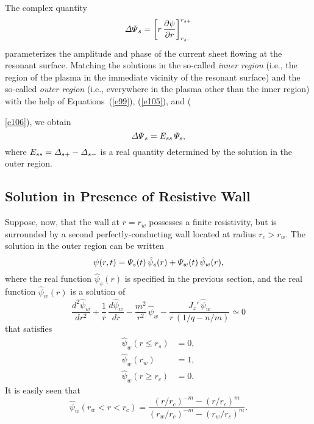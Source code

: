\documentclass[notitlepage,12pt]{article}
\begin{document}
The complex quantity
\begin{equation}
{\mit\Delta\Psi}_s = \left[r\,\frac{\partial \psi}{\partial r}\right]_{r_{s-}}^{r_{s+}}
\end{equation}
parameterizes the amplitude and phase of the current sheet flowing at the resonant surface. Matching the solutions
in the so-called {\em inner region}\/ (i.e., the region of the plasma in the immediate vicinity of the resonant surface)
and the so-called {\em outer region}\/ (i.e., everywhere in the plasma other than the inner region) with the help
of Equations~(\ref{e99}), (\ref{e105}), and ({\ref{e106}), we obtain
\begin{equation}
{\mit\Delta\Psi}_s = E_{ss}\,{\mit\Psi}_s,
\end{equation}
where $E_{ss}= {\mit\Delta}_{s+}-{\mit\Delta}_{s-}$ is a real quantity determined by the solution in the outer region. 

\subsection{Solution in Presence of Resistive Wall}\label{resistive}
Suppose, now, that the wall at $r=r_w$ possesses a finite resistivity, but is surrounded by a second perfectly-conducting wall
located at radius $r_c>r_w$.
The solution in the outer region can be written
\begin{equation}\label{e111}
\psi(r,t) = {\mit\Psi}_s(t)\,\hat{\psi}_s(r) + {\mit\Psi}_w(t)\,\hat{\psi}_w(r),
\end{equation}
where the real function $\hat{\psi}_s(r)$ is specified in the previous section, and the real function  $\hat{\psi}_w(r)$ is a solution of 
\begin{equation}\label{e100a}
\frac{d^2\hat{\psi}_w}{dr^2} + \frac{1}{r}\,\frac{d\hat{\psi}_w}{dr}-\frac{m^2}{r^2}\,\hat{\psi}_w - \frac{J_z'\,\hat{\psi}_w}{r\,(1/q-n/m)}\simeq 0
\end{equation}
that satisfies
\begin{align}\label{e101a}
\hat{\psi}_w(r\leq r_s) &= 0,\\[0.5ex]
\hat{\psi}_w(r_w) &= 1,\label{e102a}\\[0.5ex]
\hat{\psi}_w(r\geq r_c) &= 0.\label{e103a}
\end{align}
It is easily seen that
\begin{equation}\label{e117}
\hat{\psi}_w(r_w< r < r_c) = \frac{(r/r_c)^{-m} - (r/r_c)^m}{(r_w/r_c)^{-m} - (r_w/r_c)^m}.
\end{equation}

}
\end{document}

